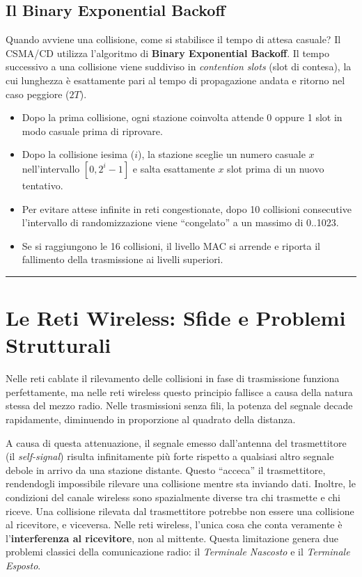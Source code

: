 \documentclass[
  italian,
  openany]{book}
\begin{document}
\subsection{Il Binary Exponential
Backoff}\label{il-binary-exponential-backoff}

Quando avviene una collisione, come si stabilisce il tempo di attesa
casuale? Il CSMA/CD utilizza l'algoritmo di \textbf{Binary Exponential
Backoff}. Il tempo successivo a una collisione viene suddiviso in
\emph{contention slots} (slot di contesa), la cui lunghezza è
esattamente pari al tempo di propagazione andata e ritorno nel caso
peggiore (\(2T\)).

\begin{itemize}
\item
  Dopo la prima collisione, ogni stazione coinvolta attende 0 oppure 1
  slot in modo casuale prima di riprovare.
\item
  Dopo la collisione iesima (\(i\)), la stazione sceglie un numero
  casuale \(x\) nell'intervallo \([0, 2^i - 1]\) e salta esattamente
  \(x\) slot prima di un nuovo tentativo.
\item
  Per evitare attese infinite in reti congestionate, dopo 10 collisioni
  consecutive l'intervallo di randomizzazione viene ``congelato'' a un
  massimo di 0..1023.
\item
  Se si raggiungono le 16 collisioni, il livello MAC si arrende e
  riporta il fallimento della trasmissione ai livelli superiori.
\end{itemize}

\begin{center}\rule{0.5\linewidth}{0.5pt}\end{center}

\section{Le Reti Wireless: Sfide e Problemi
Strutturali}\label{le-reti-wireless-sfide-e-problemi-strutturali}

Nelle reti cablate il rilevamento delle collisioni in fase di
trasmissione funziona perfettamente, ma nelle reti wireless questo
principio fallisce a causa della natura stessa del mezzo radio. Nelle
trasmissioni senza fili, la potenza del segnale decade rapidamente,
diminuendo in proporzione al quadrato della distanza.

A causa di questa attenuazione, il segnale emesso dall'antenna del
trasmettitore (il \emph{self-signal}) risulta infinitamente più forte
rispetto a qualsiasi altro segnale debole in arrivo da una stazione
distante. Questo ``acceca'' il trasmettitore, rendendogli impossibile
rilevare una collisione mentre sta inviando dati. Inoltre, le condizioni
del canale wireless sono spazialmente diverse tra chi trasmette e chi
riceve. Una collisione rilevata dal trasmettitore potrebbe non essere
una collisione al ricevitore, e viceversa. Nelle reti wireless, l'unica
cosa che conta veramente è l'\textbf{interferenza al ricevitore}, non al
mittente. Questa limitazione genera due problemi classici della
comunicazione radio: il \emph{Terminale Nascosto} e il \emph{Terminale
Esposto}.
\end{document}
